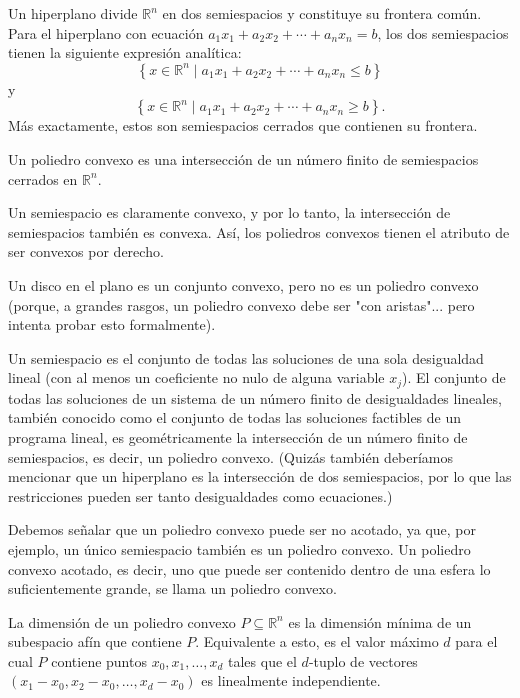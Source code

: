 \documentclass{article}
\begin{document}
Un hiperplano divide \( \mathbb{R}^n \) en dos semiespacios y constituye su frontera común. Para el hiperplano con ecuación \( a_1 x_1 + a_2 x_2 + \cdots + a_n x_n = b \), los dos semiespacios tienen la siguiente expresión analítica:
\[
\left\{ x \in \mathbb{R}^n \mid a_1 x_1 + a_2 x_2 + \cdots + a_n x_n \leq b \right\}
\]
y
\[
\left\{ x \in \mathbb{R}^n \mid a_1 x_1 + a_2 x_2 + \cdots + a_n x_n \geq b \right\}.
\]
Más exactamente, estos son semiespacios cerrados que contienen su frontera.
\begin{center}
\begin{tcolorbox}[sharp corners=south, colback=white, colframe=black, boxrule=0.8mm, width=0.9\textwidth]

    
Un poliedro convexo es una intersección de un número finito de semiespacios cerrados en \( \mathbb{R}^n \).
\end{tcolorbox}
\end{center}
Un semiespacio es claramente convexo, y por lo tanto, la intersección de semiespacios también es convexa. Así, los poliedros convexos tienen el atributo de ser convexos por derecho.

Un disco en el plano es un conjunto convexo, pero no es un poliedro convexo (porque, a grandes rasgos, un poliedro convexo debe ser "con aristas"... pero intenta probar esto formalmente).

Un semiespacio es el conjunto de todas las soluciones de una sola desigualdad lineal (con al menos un coeficiente no nulo de alguna variable \(x_j\)). El conjunto de todas las soluciones de un sistema de un número finito de desigualdades lineales, también conocido como el conjunto de todas las soluciones factibles de un programa lineal, es geométricamente la intersección de un número finito de semiespacios, es decir, un poliedro convexo. (Quizás también deberíamos mencionar que un hiperplano es la intersección de dos semiespacios, por lo que las restricciones pueden ser tanto desigualdades como ecuaciones.)

Debemos señalar que un poliedro convexo puede ser no acotado, ya que, por ejemplo, un único semiespacio también es un poliedro convexo. Un poliedro convexo acotado, es decir, uno que puede ser contenido dentro de una esfera lo suficientemente grande, se llama un poliedro convexo.

La dimensión de un poliedro convexo \(P \subseteq \mathbb{R}^n\) es la dimensión mínima de un subespacio afín que contiene \(P\). Equivalente a esto, es el valor máximo \(d\) para el cual \(P\) contiene puntos \(x_0, x_1, \ldots, x_d\) tales que el \(d\)-tuplo de vectores \((x_1 - x_0, x_2 - x_0, \ldots, x_d - x_0)\) es linealmente independiente.
\end{document}
